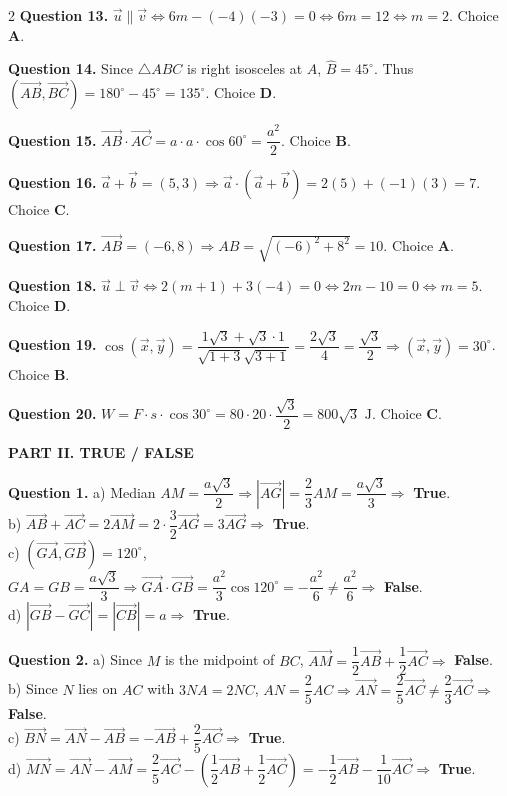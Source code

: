 \documentclass[10pt,a4paper]{article}
\begin{document}
\begin{multicols}{2}
\textbf{Question 13.} $\vec{u} \parallel \vec{v} \Leftrightarrow 6m - (-4)(-3) = 0 \Leftrightarrow 6m = 12 \Leftrightarrow m = 2$. Choice \textbf{A}.

\textbf{Question 14.} Since $\triangle ABC$ is right isosceles at $A$, $\widehat{B} = 45^\circ$. Thus $(\vec{AB}, \vec{BC}) = 180^\circ - 45^\circ = 135^\circ$. Choice \textbf{D}.

\textbf{Question 15.} $\vec{AB} \cdot \vec{AC} = a \cdot a \cdot \cos 60^\circ = \dfrac{a^2}{2}$. Choice \textbf{B}.

\textbf{Question 16.} $\vec{a} + \vec{b} = (5, 3) \Rightarrow \vec{a} \cdot (\vec{a} + \vec{b}) = 2(5) + (-1)(3) = 7$. Choice \textbf{C}.

\textbf{Question 17.} $\vec{AB} = (-6, 8) \Rightarrow AB = \sqrt{(-6)^2 + 8^2} = 10$. Choice \textbf{A}.

\textbf{Question 18.} $\vec{u} \perp \vec{v} \Leftrightarrow 2(m + 1) + 3(-4) = 0 \Leftrightarrow 2m - 10 = 0 \Leftrightarrow m = 5$. Choice \textbf{D}.

\textbf{Question 19.} $\cos(\vec{x}, \vec{y}) = \dfrac{1\sqrt{3} + \sqrt{3}\cdot 1}{\sqrt{1+3}\sqrt{3+1}} = \dfrac{2\sqrt{3}}{4} = \dfrac{\sqrt{3}}{2} \Rightarrow (\vec{x}, \vec{y}) = 30^\circ$. Choice \textbf{B}.

\textbf{Question 20.} $W = F \cdot s \cdot \cos 30^\circ = 80 \cdot 20 \cdot \dfrac{\sqrt{3}}{2} = 800\sqrt{3}\text{ J}$. Choice \textbf{C}.

\columnbreak

\textbf{\color{accent}PART II. TRUE / FALSE}

\textbf{Question 1.}
a) Median $AM = \dfrac{a\sqrt{3}}{2} \Rightarrow |\vec{AG}| = \dfrac{2}{3}AM = \dfrac{a\sqrt{3}}{3} \Rightarrow$ \textbf{True}.\\
b) $\vec{AB} + \vec{AC} = 2\vec{AM} = 2 \cdot \dfrac{3}{2}\vec{AG} = 3\vec{AG} \Rightarrow$ \textbf{True}.\\
c) $(\vec{GA}, \vec{GB}) = 120^\circ$, $GA = GB = \dfrac{a\sqrt{3}}{3} \Rightarrow \vec{GA}\cdot\vec{GB} = \dfrac{a^2}{3}\cos 120^\circ = -\dfrac{a^2}{6} \ne \dfrac{a^2}{6} \Rightarrow$ \textbf{False}.\\
d) $|\vec{GB} - \vec{GC}| = |\vec{CB}| = a \Rightarrow$ \textbf{True}.

\textbf{Question 2.}
a) Since $M$ is the midpoint of $BC$, $\vec{AM} = \dfrac{1}{2}\vec{AB} + \dfrac{1}{2}\vec{AC} \Rightarrow$ \textbf{False}.\\
b) Since $N$ lies on $AC$ with $3NA = 2NC$, $AN = \dfrac{2}{5}AC \Rightarrow \vec{AN} = \dfrac{2}{5}\vec{AC} \ne \dfrac{2}{3}\vec{AC} \Rightarrow$ \textbf{False}.\\
c) $\vec{BN} = \vec{AN} - \vec{AB} = -\vec{AB} + \dfrac{2}{5}\vec{AC} \Rightarrow$ \textbf{True}.\\
d) $\vec{MN} = \vec{AN} - \vec{AM} = \dfrac{2}{5}\vec{AC} - \left(\dfrac{1}{2}\vec{AB} + \dfrac{1}{2}\vec{AC}\right) = -\dfrac{1}{2}\vec{AB} - \dfrac{1}{10}\vec{AC} \Rightarrow$ \textbf{True}.


\end{multicols}
\end{document}
